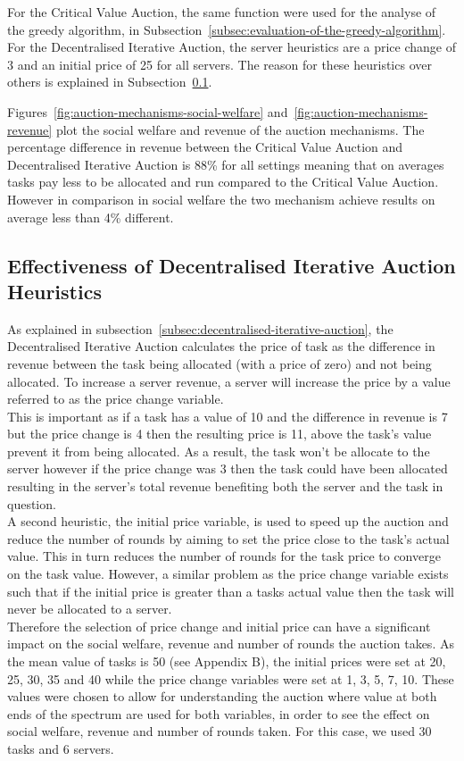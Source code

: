 For the Critical Value Auction, the same function were used for the analyse of the greedy algorithm, in
Subsection~\ref{subsec:evaluation-of-the-greedy-algorithm}. For the Decentralised Iterative Auction, the server
heuristics are a price change of 3 and an initial price of 25 for all servers. The reason for these heuristics over
others is explained in Subsection~\ref{subsec:effectiveness-of-decentralised-iterative-auction-heuristics}.

Figures~\ref{fig:auction-mechanisms-social-welfare} and~\ref{fig:auction-mechanisms-revenue} plot the social welfare
and revenue of the auction mechanisms. The percentage difference in revenue between the Critical Value Auction and
Decentralised Iterative Auction is 88\% for all settings meaning that on averages tasks pay less to be allocated and
run compared to the Critical Value Auction. However in comparison in social welfare the two mechanism achieve results
on average less than 4\% different.

\subsection{Effectiveness of Decentralised Iterative Auction Heuristics}
\label{subsec:effectiveness-of-decentralised-iterative-auction-heuristics}
As explained in subsection~\ref{subsec:decentralised-iterative-auction}, the Decentralised Iterative Auction
calculates the price of task as the difference in revenue between the task being allocated (with a price of
zero) and not being allocated. To increase a server revenue, a server will increase the price by a value referred to as
the price change variable. \\
This is important as if a task has a value of 10 and the difference in revenue is 7 but the
price change is 4 then the resulting price is 11, above the task's value prevent it from being allocated. As a result,
the task won't be allocate to the server however if the price change was 3 then the task could have been allocated
resulting in the server's total revenue benefiting both the server and the task in question. \\
A second heuristic, the initial price variable, is used to speed up the auction and reduce the number of rounds by
aiming to set the price close to the task's actual value. This in turn reduces the number of rounds for the task price
to converge on the task value. However, a similar problem as the price change variable exists such that if the initial
price is greater than a tasks actual value then the task will never be allocated to a server. \\
Therefore the selection of price change and initial price can have a significant impact on the social welfare, revenue
and number of rounds the auction takes. As the mean value of tasks is 50 (see Appendix B),
the initial prices were set at 20, 25, 30, 35 and 40 while the price change variables were set at 1, 3, 5, 7, 10. These
values were chosen to allow for understanding the auction where value at both ends of the spectrum are used for both
variables, in order to see the effect on social welfare, revenue and number of rounds taken. For this case, we used
30 tasks and 6 servers.

